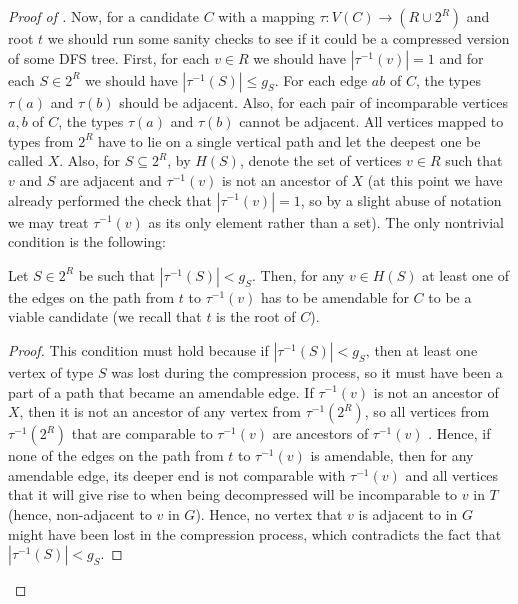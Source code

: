 \documentclass[a4paper,11pt]{article}
\begin{document}
\begin{proof}[Proof of ]
Now, for a candidate $C$ with a mapping $\tau : V(C) \to (R \cup 2^R)$ and root $t$ we should run some sanity checks to see if it could be a compressed version of some DFS tree. First, for each $v \in R$ we should have $|\tau^{-1}(v)| = 1$ and for each $S \in 2^R$ we should have $|\tau^{-1}(S)| \le g_S$. For each edge $ab$ of $C$, the types $\tau(a)$ and $\tau(b)$ should be adjacent. Also, for each pair of incomparable vertices $a, b$ of $C$, the types $\tau(a)$ and $\tau(b)$ cannot be adjacent. 
All vertices mapped to types from $2^R$ have to lie on a single vertical path and let the deepest one be called $X$. 
Also, for $S \subseteq 2^R$, by $H(S)$, denote the set of vertices $v \in R$ such that $v$ and $S$ are adjacent and $\tau^{-1}(v)$ is not an ancestor of $X$ (at this point we have already performed the check that $|\tau^{-1}(v)|=1$, so by a slight abuse of notation we may treat $\tau^{-1}(v)$ as its only element rather than a set). The only nontrivial condition is the following:

\begin{lemma} \label{lem:amendable}
Let $S \in 2^R$ be such that $|\tau^{-1}(S)| < g_S$. Then, for any $v \in H(S)$ at least one of the edges on the path from $t$ to $\tau^{-1}(v)$
has to be amendable for $C$ to be a viable candidate (we recall that $t$ is the root of $C$).
\end{lemma}
\begin{proof}
This condition must hold because if $|\tau^{-1}(S)| < g_S$, then at least one vertex of type $S$ was lost during the compression process, so it must have been a part of a path that became an amendable edge. If $\tau^{-1}(v)$ is not an ancestor of $X$, then it is not an ancestor of any vertex from $\tau^{-1}(2^R)$, so all vertices from $\tau^{-1}(2^R)$ that are comparable to $\tau^{-1}(v)$ are ancestors of $\tau^{-1}(v)$ . Hence, if none of the edges on the path from $t$ to $\tau^{-1}(v)$ is amendable, then for any amendable edge, its deeper end is not comparable with $\tau^{-1}(v)$ and all vertices that it will give rise to when being decompressed will be incomparable to $v$ in $T$ (hence, non-adjacent to $v$ in $G$). Hence, no vertex that $v$ is adjacent to in $G$ might have been lost in the compression process, which contradicts the fact that $|\tau^{-1}(S)| < g_S$.
\end{proof}


\end{proof}
\end{document}
